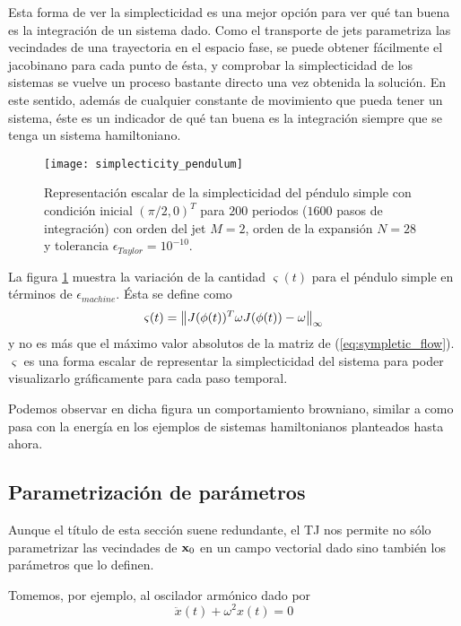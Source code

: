 Esta forma de ver la simplecticidad es una mejor opción para ver qué tan buena es la integración de un sistema dado. Como el transporte de jets parametriza las vecindades de una trayectoria en el espacio fase, se puede obtener fácilmente el jacobinano para cada punto de ésta, y comprobar la simplecticidad de los sistemas se vuelve un proceso bastante directo una vez obtenida la solución. En este sentido, además de cualquier constante de movimiento que pueda tener un sistema, éste es un indicador de qué tan buena es la integración siempre que se tenga un sistema hamiltoniano.

\begin{figure}[h!]
 \centering
 \texttt{[image: simplecticity\_pendulum]}
 \caption{Representación escalar de la simplecticidad del péndulo simple con condición inicial $( \pi/2,0)^T$ para $200$ periodos ($1600 $ pasos de integración) con orden del jet $M=2$, orden de la expansión $N = 28$ y tolerancia $\epsilon_{Taylor} = 10^{-10}$.}
 \label{fig:simplecticity_pendulum}
\end{figure}

La figura \ref{fig:simplecticity_pendulum} muestra la variación de la cantidad $\varsigma(t)$ para el péndulo simple en términos de $\epsilon_{machine}$. Ésta se define como
\begin{equation}
 \varsigma(t) = \left\lVert J(\phi(t))^T \omega J(\phi(t)) - \omega \right\rVert_\infty
 \label{eq:scalar_symplecticity}
\end{equation}
y no es más que el máximo valor absolutos de la matriz de (\ref{eq:sympletic_flow}). $\varsigma$ es una forma escalar de representar la simplecticidad del sistema para poder visualizarlo gráficamente para cada paso temporal.
  
Podemos observar en dicha figura un comportamiento browniano, similar a como pasa con la energía en los ejemplos de sistemas hamiltonianos planteados hasta ahora.


\subsection{Parametrización de parámetros}
\label{sec:parameter_variation}
Aunque el título de esta sección suene redundante, el TJ nos permite no sólo parametrizar las vecindades de $\mathbf{x}_0$ en un campo vectorial dado sino también los parámetros que lo definen.

Tomemos, por ejemplo, al oscilador armónico dado por  
\begin{equation}
 \ddot{x}(t) + \omega^2 x(t) = 0
 \label{eq:one_dim_oscil}
\end{equation}

